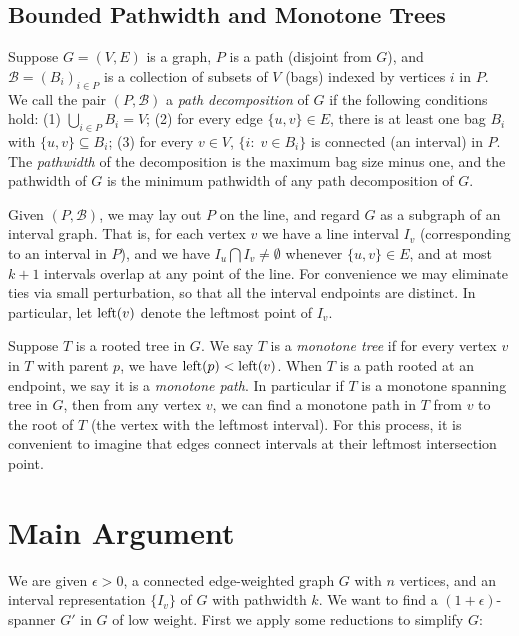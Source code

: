 \documentclass{llncs}
\begin{document}
\subsection{Bounded Pathwidth and Monotone Trees}
\label{def:bpmt}
Suppose $G=(V,E)$ is a graph, $P$ is a path (disjoint from $G$), and
$\mathcal{B}={(B_i)}_{i\in P}$ is a collection of subsets of $V$ (bags) indexed
by vertices $i$ in $P$.  We call the pair $(P, \mathcal{B})$ a
\emph{path decomposition} of $G$ if the following conditions hold: (1)
${\bigcup}_{i\in P} B_i = V$; (2) for every edge $\{u, v\}\in E$, there
is at least one bag $B_i$ with $\{u,v\}\subseteq B_i$; (3) for
every $v\in V$, $\{i:\; v\in B_i\}$ is connected
(an interval) in $P$.  The \emph{pathwidth} of the decomposition is
the maximum bag size minus one, and the pathwidth of $G$ is the
minimum pathwidth of any path decomposition of $G$.

Given $(P, \mathcal{B})$, we may lay out $P$ on the line, and regard
$G$ as a subgraph of an interval graph.  That is, for each vertex $v$
we have a line interval $I_v$ (corresponding to an interval in $P$),
and we have $I_u \bigcap I_v\neq\emptyset$ whenever $\{u, v\}\in E$,
and at most $k+1$ intervals overlap at any point of the line.  For
convenience we may eliminate ties via small perturbation, so that all the interval endpoints
are distinct.  In particular, let $\mbox{left}(v)$ denote the leftmost point
of $I_v$.   



Suppose $T$ is a rooted tree in $G$.  We say $T$ is a \emph{monotone tree} if
for every vertex $v$ in $T$ with parent $p$, we have $\mbox{left}(p) <
\mbox{left}(v)$.  When $T$ is a path rooted at an endpoint, we say it is a
\emph{monotone path}.  In particular if $T$ is a monotone spanning
tree in $G$, then from any vertex $v$, we can find a monotone path in
$T$ from $v$ to the root of $T$ (the vertex with the leftmost
interval).  For this process, it is convenient to imagine that edges
connect intervals at their leftmost intersection point.

\section{Main Argument}
\label{sec:mainarg}

We are given $\epsilon>0$, a connected edge-weighted graph $G$ with
$n$ vertices, and an interval representation $\{I_v\}$ of $G$ with
pathwidth $k$.  We want to find a $(1+\epsilon)$-spanner $G'$ in $G$
of low weight.  First we apply some reductions to simplify $G$:
\end{document}
